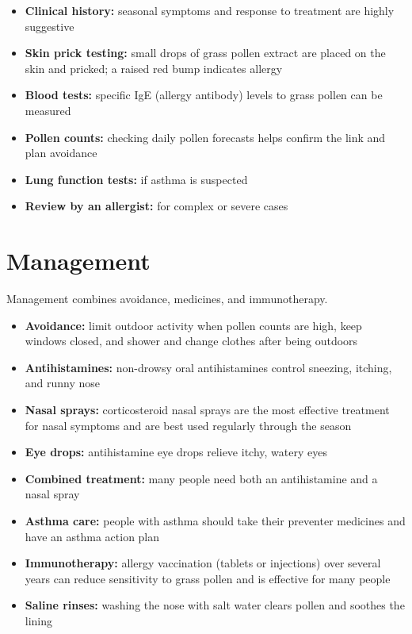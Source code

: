 \begin{itemize}
    \item \textbf{Clinical history:} seasonal symptoms and response to treatment are highly suggestive
    \item \textbf{Skin prick testing:} small drops of grass pollen extract are placed on the skin and pricked; a raised red bump indicates allergy
    \item \textbf{Blood tests:} specific IgE (allergy antibody) levels to grass pollen can be measured
    \item \textbf{Pollen counts:} checking daily pollen forecasts helps confirm the link and plan avoidance
    \item \textbf{Lung function tests:} if asthma is suspected
    \item \textbf{Review by an allergist:} for complex or severe cases
\end{itemize}

\section*{Management}
Management combines avoidance, medicines, and immunotherapy.

\begin{itemize}
    \item \textbf{Avoidance:} limit outdoor activity when pollen counts are high, keep windows closed, and shower and change clothes after being outdoors
    \item \textbf{Antihistamines:} non-drowsy oral antihistamines control sneezing, itching, and runny nose
    \item \textbf{Nasal sprays:} corticosteroid nasal sprays are the most effective treatment for nasal symptoms and are best used regularly through the season
    \item \textbf{Eye drops:} antihistamine eye drops relieve itchy, watery eyes
    \item \textbf{Combined treatment:} many people need both an antihistamine and a nasal spray
    \item \textbf{Asthma care:} people with asthma should take their preventer medicines and have an asthma action plan
    \item \textbf{Immunotherapy:} allergy vaccination (tablets or injections) over several years can reduce sensitivity to grass pollen and is effective for many people
    \item \textbf{Saline rinses:} washing the nose with salt water clears pollen and soothes the lining
\end{itemize}

